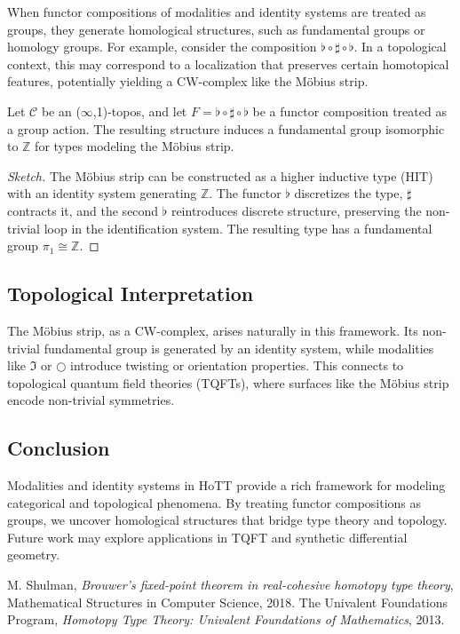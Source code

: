\documentclass{article}
\begin{document}
When functor compositions of modalities and identity systems are treated as groups, they generate homological structures, such as fundamental groups or homology groups. For example, consider the composition $\flat \circ \sharp \circ \flat$. In a topological context, this may correspond to a localization that preserves certain homotopical features, potentially yielding a CW-complex like the Möbius strip.

\begin{theorem}
Let $\mathcal{C}$ be an ($\infty$,1)-topos, and let $F = \flat \circ \sharp \circ \flat$ be a functor composition treated as a group action. The resulting structure induces a fundamental group isomorphic to $\mathbb{Z}$ for types modeling the Möbius strip.
\end{theorem}

\begin{proof}[Sketch]
The Möbius strip can be constructed as a higher inductive type (HIT) with an identity system generating $\mathbb{Z}$. The functor $\flat$ discretizes the type, $\sharp$ contracts it, and the second $\flat$ reintroduces discrete structure, preserving the non-trivial loop in the identification system. The resulting type has a fundamental group $\pi_1 \cong \mathbb{Z}$.
\end{proof}

\subsection{Topological Interpretation}

The Möbius strip, as a CW-complex, arises naturally in this framework. Its non-trivial fundamental group is generated by an identity system, while modalities like $\Im$ or $\bigcirc$ introduce twisting or orientation properties. This connects to topological quantum field theories (TQFTs), where surfaces like the Möbius strip encode non-trivial symmetries.

\subsection{Conclusion}

Modalities and identity systems in HoTT provide a rich framework for modeling categorical and topological phenomena. By treating functor compositions as groups, we uncover homological structures that bridge type theory and topology. Future work may explore applications in TQFT and synthetic differential geometry.

\begin{thebibliography}{9}
 M. Shulman, \emph{Brouwer’s fixed-point theorem in real-cohesive homotopy type theory}, Mathematical Structures in Computer Science, 2018.
 The Univalent Foundations Program, \emph{Homotopy Type Theory: Univalent Foundations of Mathematics}, 2013.
\end{thebibliography}
\end{document}
